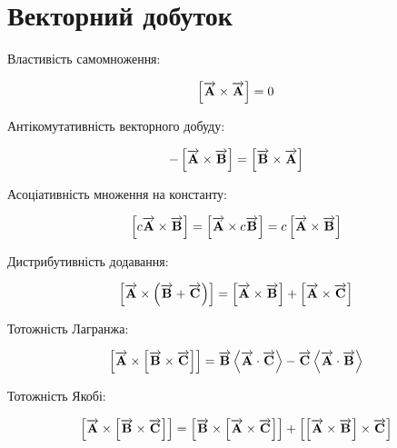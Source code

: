 \section{Векторний добуток}

Властивість самомноження:

\begin{equation*} 
\crossprod{\vect{A}}{\vect{A}} = 0
\end{equation*}

Антікомутативність векторного добуду:

\begin{equation*} 
- \crossprod{\vect{A}}{\vect{B}} = \crossprod{\vect{B}}{\vect{A}}
\end{equation*}

Асоціативність множення на константу:

\begin{equation*} 
\crossprod{c \vect{A}}{\vect{B}} = \crossprod{\vect{A}}{c \vect{B}} =
c \crossprod{\vect{A}}{\vect{B}}
\end{equation*}

Дистрибутивність додавання:

\begin{equation*} 
\crossprod{\vect{A}}{ \left( \vect{B} + \vect{C} \right) } = 
\crossprod{\vect{A}}{\vect{B}} + \crossprod{\vect{A}}{\vect{C}}
\end{equation*}

Тотожність Лагранжа:

\begin{equation*}
\crossprod{\vect{A}}{\crossprod{\vect{B}}{\vect{C}}} =
\vect{B} \dotprod{\vect{A}}{\vect{C}} - 
\vect{C} \dotprod{\vect{A}}{\vect{B}}
\end{equation*}

Тотожність Якобі:

\begin{equation*}
\crossprod{\vect{A}}{\crossprod{\vect{B}}{\vect{C}}} =
\crossprod{\vect{B}}{\crossprod{\vect{A}}{\vect{C}}} +
\crossprod{\crossprod{\vect{A}}{\vect{B}}}{\vect{C}} 
\end{equation*}
